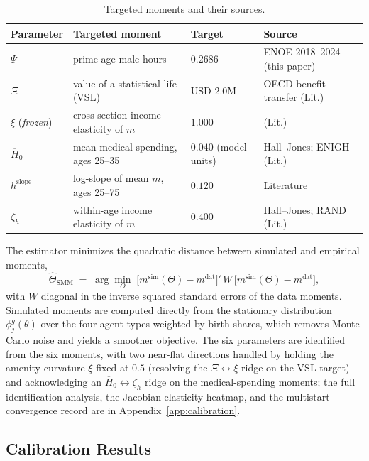 \documentclass[12pt,a4paper]{article}
\begin{document}
\begin{table}[H]
\centering
\caption{Targeted moments and their sources.}
\label{tab:targeted_moments}
\begin{tabular}{llll}
\toprule
Parameter & Targeted moment & Target & Source \\
\midrule
$\Psi$               & prime-age male hours                    & $0.2686$            & ENOE 2018--2024 (this paper) \\
$\Xi$                & value of a statistical life (VSL)       & USD 2.0M            & OECD benefit transfer (Lit.) \\
$\xi$ (\emph{frozen}) & cross-section income elasticity of $m$ & $1.000$             & \citet{hall_jones_2007} (Lit.) \\
$\overline{H}_0$     & mean medical spending, ages 25--35      & $0.040$ (model units) & Hall--Jones; ENIGH (Lit.) \\
$h^{\mathrm{slope}}$ & log-slope of mean $m$, ages 25--75      & $0.120$             & Literature \\
$\zeta_h$            & within-age income elasticity of $m$     & $0.400$             & Hall--Jones; RAND (Lit.) \\
\bottomrule
\end{tabular}
\end{table}

The estimator minimizes the quadratic distance between simulated and empirical moments,
\begin{equation}
\label{eq:smm_objective}
\widehat\Theta_{\mathrm{SMM}} \;=\; \arg\min_{\Theta}\; \bigl[m^{\mathrm{sim}}(\Theta) - m^{\mathrm{dat}}\bigr]'\, W\, \bigl[m^{\mathrm{sim}}(\Theta) - m^{\mathrm{dat}}\bigr],
\end{equation}
with $W$ diagonal in the inverse squared standard errors of the data moments. Simulated moments are computed directly from the stationary distribution $\phi^g_j(\theta)$ over the four agent types weighted by birth shares, which removes Monte Carlo noise and yields a smoother objective. The six parameters are identified from the six moments, with two near-flat directions handled by holding the amenity curvature $\xi$ fixed at $0.5$ (resolving the $\Xi\leftrightarrow\xi$ ridge on the VSL target) and acknowledging an $\overline{H}_0\leftrightarrow\zeta_h$ ridge on the medical-spending moments; the full identification analysis, the Jacobian elasticity heatmap, and the multistart convergence record are in Appendix~\ref{app:calibration}.

\subsection{Calibration Results}
\label{subsec:calibration_results}
\end{document}
